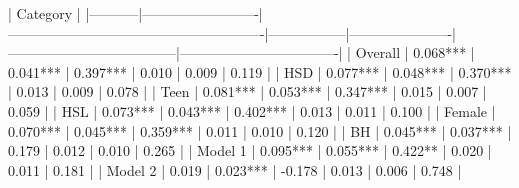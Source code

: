 | Category  | %
|-----------|-------------------------|-------------------------------------------------------|-----------------|----------------------|------------------------------------|----------------------------------|
| Overall   | 0.068***                | 0.041***                                              | 0.397***        | 0.010                | 0.009                              | 0.119                            |
| HSD       | 0.077***                | 0.048***                                              | 0.370***        | 0.013                | 0.009                              | 0.078                            |
| Teen      | 0.081***                | 0.053***                                              | 0.347***        | 0.015                | 0.007                              | 0.059                            |
| HSL       | 0.073***                | 0.043***                                              | 0.402***        | 0.013                | 0.011                              | 0.100                            |
| Female    | 0.070***                | 0.045***                                              | 0.359***        | 0.011                | 0.010                              | 0.120                            |
| BH        | 0.045***                | 0.037***                                              | 0.179           | 0.012                | 0.010                              | 0.265                            |
| Model 1   | 0.095***                | 0.055***                                              | 0.422**         | 0.020                | 0.011                              | 0.181                            |
| Model 2   | 0.019                   | 0.023***                                              | -0.178          | 0.013                | 0.006                              | 0.748                            |
